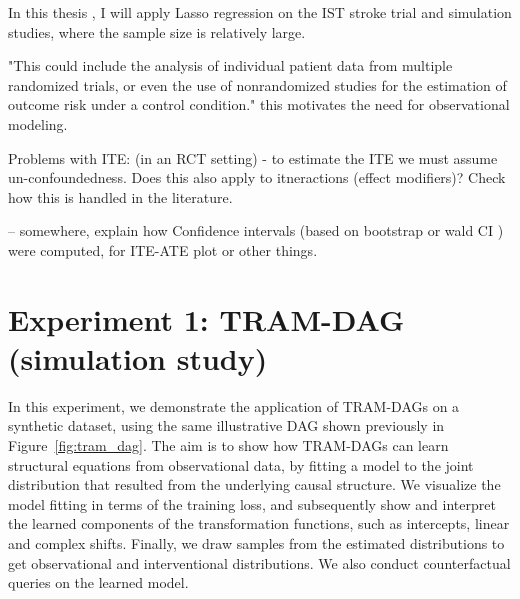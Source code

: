 In this thesis , I will apply Lasso regression on the IST stroke trial and simulation studies, where the sample size is relatively large.


 
 "This could include the analysis of individual patient data from multiple randomized trials, or even the use of nonrandomized studies for the estimation of outcome risk under a control condition." this motivates the need for observational modeling.


Problems with ITE: (in an RCT setting)
- to estimate the ITE we must assume un-confoundedness. Does this also apply to itneractions (effect modifiers)? Check how this is handled in the literature.



-- somewhere, explain how Confidence intervals (based on bootstrap or wald CI ) were computed, for ITE-ATE plot or other things.









\section{Experiment 1: TRAM-DAG (simulation study)}

In this experiment, we demonstrate the application of TRAM-DAGs on a synthetic dataset, using the same illustrative DAG shown previously in Figure~\ref{fig:tram_dag}. The aim is to show how TRAM-DAGs can learn structural equations from observational data, by fitting a model to the joint distribution that resulted from the underlying causal structure. We visualize the model fitting in terms of the training loss, and subsequently show and interpret the learned components of the transformation functions, such as intercepts, linear and complex shifts. Finally, we draw samples from the estimated distributions to get observational and interventional distributions. We also conduct counterfactual queries on the learned model.

